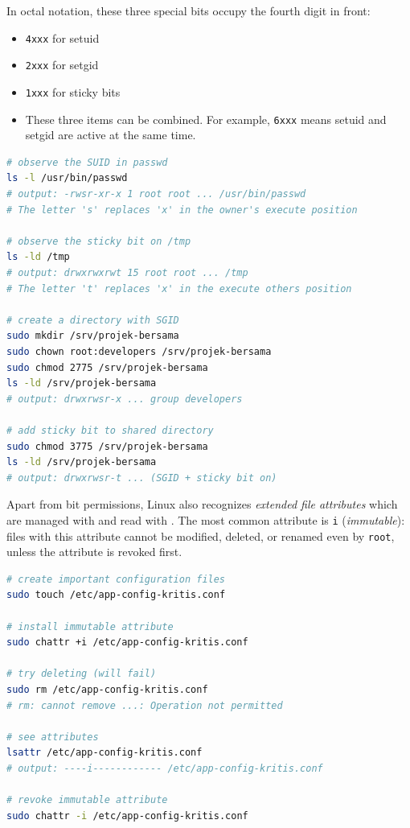 In octal notation, these three special bits occupy the fourth digit in front:

\begin{itemize}
\item \texttt{4xxx} for setuid
\item \texttt{2xxx} for setgid
\item \texttt{1xxx} for sticky bits
\item These three items can be combined. For example, \texttt{6xxx} means setuid and setgid are active at the same time.
\end{itemize}

\begin{lstlisting}[language=bash, caption={Observe and set special bits}]
# observe the SUID in passwd
ls -l /usr/bin/passwd
# output: -rwsr-xr-x 1 root root ... /usr/bin/passwd
# The letter 's' replaces 'x' in the owner's execute position

# observe the sticky bit on /tmp
ls -ld /tmp
# output: drwxrwxrwt 15 root root ... /tmp
# The letter 't' replaces 'x' in the execute others position

# create a directory with SGID
sudo mkdir /srv/projek-bersama
sudo chown root:developers /srv/projek-bersama
sudo chmod 2775 /srv/projek-bersama
ls -ld /srv/projek-bersama
# output: drwxrwsr-x ... group developers

# add sticky bit to shared directory
sudo chmod 3775 /srv/projek-bersama
ls -ld /srv/projek-bersama
# output: drwxrwsr-t ... (SGID + sticky bit on)
\end{lstlisting}

Apart from bit permissions, Linux also recognizes \textit{extended file attributes} which are managed with  and read with . The most common attribute is \texttt{i} (\textit{immutable}): files with this attribute cannot be modified, deleted, or renamed even by \texttt{root}, unless the attribute is revoked first.

\begin{lstlisting}[language=bash, caption={Extended attributes with chattr and lsattr}]
# create important configuration files
sudo touch /etc/app-config-kritis.conf

# install immutable attribute
sudo chattr +i /etc/app-config-kritis.conf

# try deleting (will fail)
sudo rm /etc/app-config-kritis.conf
# rm: cannot remove ...: Operation not permitted

# see attributes
lsattr /etc/app-config-kritis.conf
# output: ----i------------ /etc/app-config-kritis.conf

# revoke immutable attribute
sudo chattr -i /etc/app-config-kritis.conf
\end{lstlisting}


